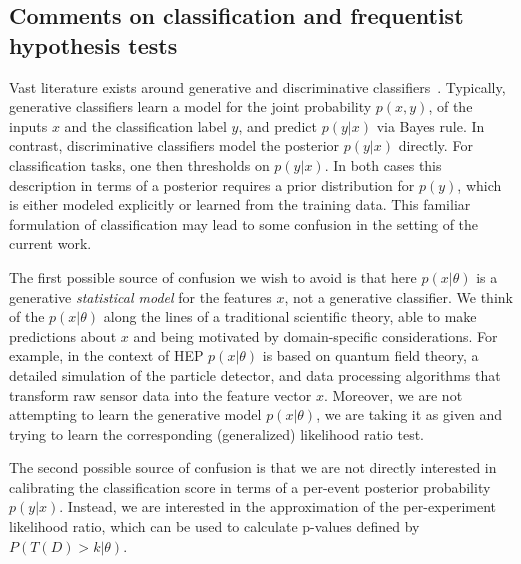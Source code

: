 \documentclass{article} %
\begin{document}
\subsection{Comments on classification and frequentist hypothesis tests}

Vast literature exists around generative and discriminative classifiers~\cite{AndrewY.Ng}. Typically, generative classifiers learn a model for the joint probability $p(x,y)$, of the inputs $x$ and the classification label $y$, and predict $p(y|x)$ via Bayes rule. In contrast, discriminative classifiers model the posterior $p(y|x)$ directly. For classification tasks, one then thresholds on $p(y|x)$. In both cases this description in terms of a posterior requires a prior distribution for $p(y)$, which is either modeled explicitly or learned from the training data. 
This familiar formulation of classification may lead to some confusion in the setting of the current work. 

The first possible source of confusion we wish to avoid is that here $p(x|\theta)$  is a generative \textit{statistical model} for the features $x$, not a generative classifier. We think of the  $p(x|\theta)$ along the lines of a traditional scientific theory, able to make predictions about $x$ and being motivated by domain-specific considerations. For example, in the context of HEP $p(x|\theta)$ is based on quantum field theory, a detailed simulation of the particle detector, and data processing algorithms that transform raw sensor data into the feature vector $x$.  
Moreover, we are not attempting to learn the generative model $p(x|\theta)$, we are taking it as given and trying to learn the corresponding (generalized) likelihood ratio test.

The second possible source of confusion is that 
we are not directly interested in calibrating the classification score in terms of a per-event posterior probability $p(y|x)$. 
Instead, we are interested in the approximation of the per-experiment likelihood ratio, which can be used to calculate p-values defined by $P(T(D) > k |\theta)$.
%

\end{document}

